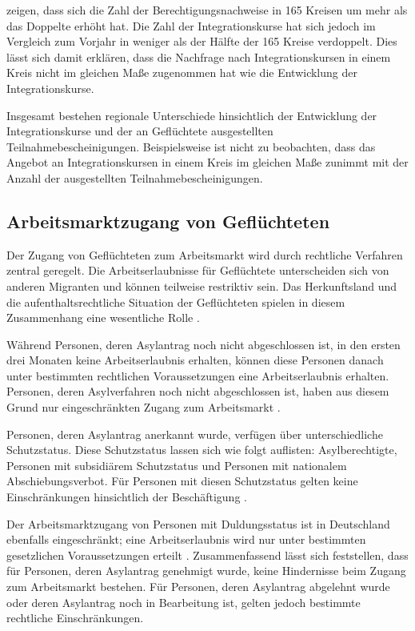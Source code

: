\textcite{Kanas:2023} zeigen, dass sich die Zahl der Berechtigungsnachweise in 165 Kreisen um mehr als das Doppelte erhöht hat. Die Zahl der Integrationskurse hat sich jedoch im Vergleich zum Vorjahr in weniger als der Hälfte der 165 Kreise verdoppelt. Dies lässt sich damit erklären, dass die Nachfrage nach Integrationskursen in einem Kreis nicht im gleichen Maße zugenommen hat wie die Entwicklung der Integrationskurse.

Insgesamt bestehen regionale Unterschiede hinsichtlich der Entwicklung der Integrationskurse und der an Geflüchtete ausgestellten Teilnahmebescheinigungen. Beispielsweise ist nicht zu beobachten, dass das Angebot an Integrationskursen in einem Kreis im gleichen Maße zunimmt mit der Anzahl der ausgestellten Teilnahmebescheinigungen.

\subsection{Arbeitsmarktzugang von Geflüchteten}
\label{sec:arb-zugang}

Der Zugang von Geflüchteten zum Arbeitsmarkt wird durch rechtliche Verfahren zentral geregelt. Die Arbeitserlaubnisse für Geflüchtete unterscheiden sich von anderen Migranten und können teilweise restriktiv sein. Das Herkunftsland und die aufenthaltsrechtliche Situation der Geflüchteten spielen in diesem Zusammenhang eine wesentliche Rolle \parencite{kosyakova2020role}.

Während Personen, deren Asylantrag noch nicht abgeschlossen ist, in den ersten drei Monaten keine Arbeitserlaubnis erhalten, können diese Personen danach unter bestimmten rechtlichen Voraussetzungen eine Arbeitserlaubnis erhalten. Personen, deren Asylverfahren noch nicht abgeschlossen ist, haben aus diesem Grund nur eingeschränkten Zugang zum Arbeitsmarkt \parencite{kosyakova2020role} .

Personen, deren Asylantrag anerkannt wurde, verfügen über unterschiedliche Schutzstatus. Diese Schutzstatus lassen sich wie folgt auflisten: Asylberechtigte, Personen mit subsidiärem Schutzstatus und Personen mit nationalem Abschiebungsverbot. Für Personen mit diesen Schutzstatus gelten keine Einschränkungen hinsichtlich der Beschäftigung \parencite{muller2016unterstutzungsmassnahmen}.

Der Arbeitsmarktzugang von Personen mit Duldungsstatus ist in Deutschland ebenfalls eingeschränkt; eine Arbeitserlaubnis wird nur unter bestimmten gesetzlichen Voraussetzungen erteilt \parencites{kosyakova2020role}{stache2024auswirkungen}. Zusammenfassend lässt sich feststellen, dass für Personen, deren Asylantrag genehmigt wurde, keine Hindernisse beim Zugang zum Arbeitsmarkt bestehen. Für Personen, deren Asylantrag abgelehnt wurde oder deren Asylantrag noch in Bearbeitung ist, gelten jedoch bestimmte rechtliche Einschränkungen.

